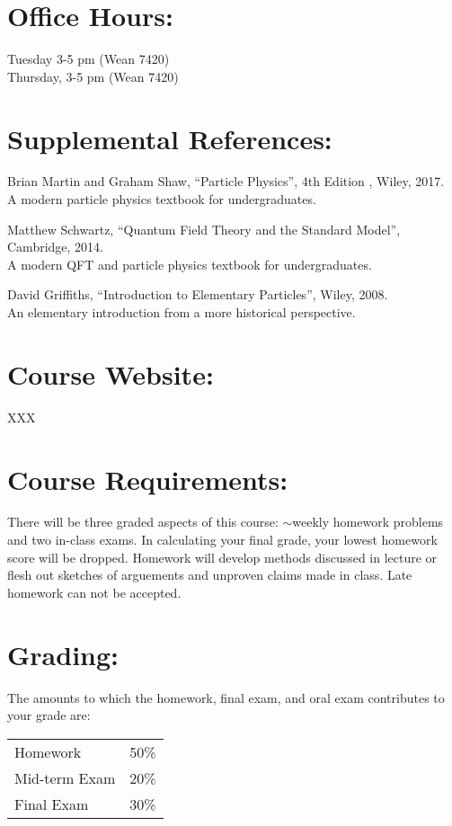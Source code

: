 \documentclass[margin,line]{res}
\begin{document}
\begin{resume}
\section{Office Hours:}
Tuesday 3-5 pm (Wean 7420)\\
Thursday, 3-5 pm (Wean 7420)


\section{Supplemental References:}
Brian Martin and Graham Shaw, ``Particle Physics'', 4th Edition , Wiley, 2017.\\
A modern particle physics textbook for undergraduates.

Matthew Schwartz, ``Quantum Field Theory and the Standard Model'', Cambridge, 2014.\\
A modern QFT and particle physics textbook for undergraduates.

David Griffiths, ``Introduction to Elementary Particles'', Wiley, 2008.\\
An elementary introduction from a more historical perspective.

\section{Course Website:}  XXX

\section{Course Requirements:}
There will be three graded aspects of this course: $\sim$weekly homework problems and two in-class exams.
In calculating your final grade, your lowest homework score will be dropped.
Homework will develop methods discussed in lecture or flesh out sketches of arguements and unproven claims made in class.
Late homework can not be accepted.

\section{Grading:} 
The amounts to which the homework, final exam, and oral exam contributes to
your grade are:
\begin{center}
\begin{tabular}{lc}
Homework & 50\%\\
Mid-term Exam & 20\%\\
Final Exam & 30\%\\
\end{tabular}
\end{center}


\end{resume}
\end{document}
